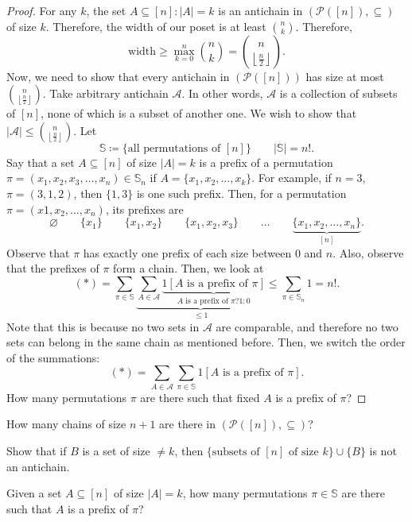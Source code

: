 \begin{proof}
	For any \( k \), the set \( A \subseteq [n] \colon |A| = k \) is an antichain in \( (\mathcal{P}([n]), \subseteq) \) of size \( k \). Therefore, the width of our poset is at least \( \binom{n}{k} \). Therefore, \[
		\text{width} \ge \max_{k=0}^{n}\binom{n}{k} = \binom{n}{\left\lfloor \frac{n}{2} \right\rfloor }
	.\] Now, we need to show that every antichain in \( (\mathcal{P}([n])) \) has size at most \( \binom{n}{\left\lfloor \frac{n}{2} \right\rfloor} \). Take arbitrary antichain \( \mathcal{A} \). In other words, \( \mathcal{A} \) is a collection of subsets of \( [n] \), none of which is a subset of another one. We wish to show that \( |\mathcal{A}| \le \binom{n}{\left\lfloor \frac{n}{2} \right\rfloor} \). Let 
	\[
		\mathbb{S} \coloneq \{\text{all permutations of }[n]\}  \qquad |\mathbb{S}| = n!
	.\] 
	Say that a set \( A \subseteq [n] \) of size \( |A| = k \) is a prefix of a permutation \( \pi =(x_{1},x_{2},x_{3},\ldots ,x_n) \in \mathbb{S}_n \) if \( A=\{x_{1},x_{2},\ldots ,x_k\}   \). For example, if \( n=3 \), \( \pi =(3,1,2) \), then \( \{1,3\}   \) is one such prefix. Then, for a permutation \( \pi =(x1,x_{2},\ldots ,x_n) \), its prefixes are \[
		\varnothing \qquad \{x_{1}\} \qquad \{x_{1},x_{2}\} \qquad \{x_{1},x_{2},x_{3}\} \qquad \ldots \qquad \underbrace{\{x_{1},x_{2},\ldots ,x_{n}\}}_{[n]}
	.\] Observe that \( \pi  \) has exactly one prefix of each size between \( 0 \) and \( n \). Also, observe that the prefixes of \( \pi  \) form a chain. Then, we look at \[
	(*) = \sum_{\pi \in \mathbb{S}} \underbrace{\sum_{A \in \mathcal{A}} \underbrace{1[A \text{ is a prefix of } \pi ]}_{A \text{ is a prefix of } \pi ? 1 : 0}}_{\le 1} \le \sum_{\pi  \in \mathbb{S}_n} 1 = n!
	.\] Note that this is because no two sets in \( \mathcal{A} \) are comparable, and therefore no two sets can belong in the same chain as mentioned before. Then, we switch the order of the summations: \[
	(*) = \sum_{A \in \mathcal{A}} \sum_{\pi  \in \mathbb{S}} 1[A \text{ is a prefix of } \pi ]
	.\] How many permutations \( \pi  \) are there such that fixed \( A \) is a prefix of \( \pi  \)?
\end{proof}

How many chains of size \( n+1 \) are there in \( (\mathcal{P}([n]), \subseteq) \)?

Show that if \( B \) is a set of size \( \neq k \), then \(\{\text{subsets of } [n] \text{ of size } k \}  \cup \{B\}\) is not an antichain.

Given a set \( A \subseteq [n] \) of size \( |A|=k \), how many permutations \( \pi  \in \mathbb{S} \) are there such that \( A  \) is a prefix of \( \pi  \)?
